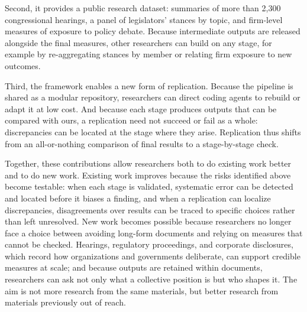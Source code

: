 \documentclass[11pt]{article}
\begin{document}
Second, it provides a public research dataset: summaries of more than 2,300 congressional hearings, a panel of legislators' stances by topic, and firm-level measures of exposure to policy debate. Because intermediate outputs are released alongside the final measures, other researchers can build on any stage, for example by re-aggregating stances by member or relating firm exposure to new outcomes.

Third, the framework enables a new form of replication. Because the pipeline is shared as a modular repository, researchers can direct coding agents to rebuild or adapt it at low cost. And because each stage produces outputs that can be compared with ours, a replication need not succeed or fail as a whole: discrepancies can be located at the stage where they arise. Replication thus shifts from an all-or-nothing comparison of final results to a stage-by-stage check.

Together, these contributions allow researchers both to do existing work better and to do new work. Existing work improves because the risks identified above become testable: when each stage is validated, systematic error can be detected and located before it biases a finding, and when a replication can localize discrepancies, disagreements over results can be traced to specific choices rather than left unresolved. New work becomes possible because researchers no longer face a choice between avoiding long-form documents and relying on measures that cannot be checked. Hearings, regulatory proceedings, and corporate disclosures, which record how organizations and governments deliberate, can support credible measures at scale; and because outputs are retained within documents, researchers can ask not only what a collective position is but who shapes it. The aim is not more research from the same materials, but better research from materials previously out of reach.

\vspace{2em}
\end{document}
